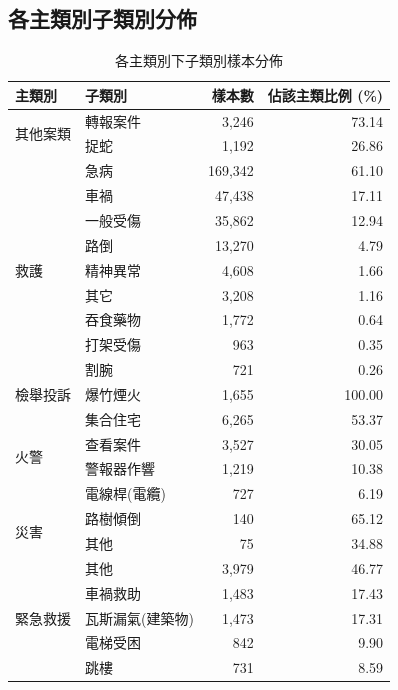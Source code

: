 \documentclass[UTF8,a4paper,11pt]{ctexart}
\begin{document}
\subsection{各主類別子類別分佈}

\begin{table}[htbp]
  \centering
  \caption{各主類別下子類別樣本分佈}
  \label{tab:sub-dist}
  \small
  \begin{tabular}{llrr}
    \toprule
    主類別 & 子類別 & 樣本數 & 佔該主類比例 (\%) \\
    \midrule
    \multirow{2}{*}{其他案類}
      & 轉報案件 & 3,246 & 73.14 \\
      & 捉蛇     & 1,192 & 26.86 \\
    \midrule
    \multirow{9}{*}{救護}
      & 急病     & 169,342 & 61.10 \\
      & 車禍     &  47,438 & 17.11 \\
      & 一般受傷 &  35,862 & 12.94 \\
      & 路倒     &  13,270 &  4.79 \\
      & 精神異常 &   4,608 &  1.66 \\
      & 其它     &   3,208 &  1.16 \\
      & 吞食藥物 &   1,772 &  0.64 \\
      & 打架受傷 &     963 &  0.35 \\
      & 割腕     &     721 &  0.26 \\
    \midrule
    檢舉投訴 & 爆竹煙火 & 1,655 & 100.00 \\
    \midrule
    \multirow{4}{*}{火警}
      & 集合住宅       & 6,265 & 53.37 \\
      & 查看案件       & 3,527 & 30.05 \\
      & 警報器作響     & 1,219 & 10.38 \\
      & 電線桿(電纜)   &   727 &  6.19 \\
    \midrule
    \multirow{2}{*}{災害}
      & 路樹傾倒 & 140 & 65.12 \\
      & 其他     &  75 & 34.88 \\
    \midrule
    \multirow{5}{*}{緊急救援}
      & 其他             & 3,979 & 46.77 \\
      & 車禍救助         & 1,483 & 17.43 \\
      & 瓦斯漏氣(建築物) & 1,473 & 17.31 \\
      & 電梯受困         &   842 &  9.90 \\
      & 跳樓             &   731 &  8.59 \\
    \bottomrule
  \end{tabular}
\end{table}
\end{document}
